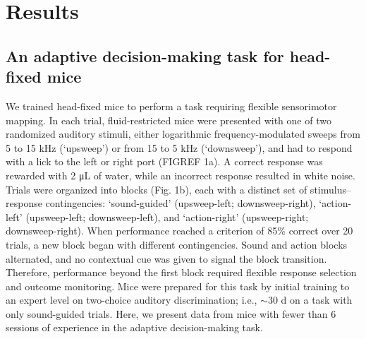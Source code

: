 \section{Results}

\subsection{An adaptive decision-making task for head-fixed mice}

We trained head-fixed mice to perform a task requiring flexible sensorimotor mapping. In each trial, fluid-restricted mice were presented with one of two randomized auditory stimuli, either logarithmic frequency-modulated sweeps from 5 to 15 kHz (`upsweep') or from 15 to 5 kHz (`downsweep'), and had to respond with a lick to the left or right port (FIGREF 1a). A correct response was rewarded with 2 \unit{\micro\liter} of water, while an incorrect response resulted in white noise. Trials were organized into blocks (Fig. 1b), each with a distinct set of stimulus--response contingencies: `sound-guided' (upsweep-left; downsweep-right), `action-left' (upsweep-left; downsweep-left), and `action-right' (upsweep-right; downsweep-right). When performance reached a criterion of 85\% correct over 20 trials, a new block began with different contingencies. Sound and action blocks alternated, and no contextual cue was given to signal the block transition. Therefore, performance beyond the first block required flexible response selection and outcome monitoring. Mice were prepared for this task by initial training to an expert level on two-choice auditory discrimination; i.e., $\sim 30$ d on a task with only sound-guided trials. Here, we present data from mice with fewer than 6 sessions of experience in the adaptive decision-making task.



